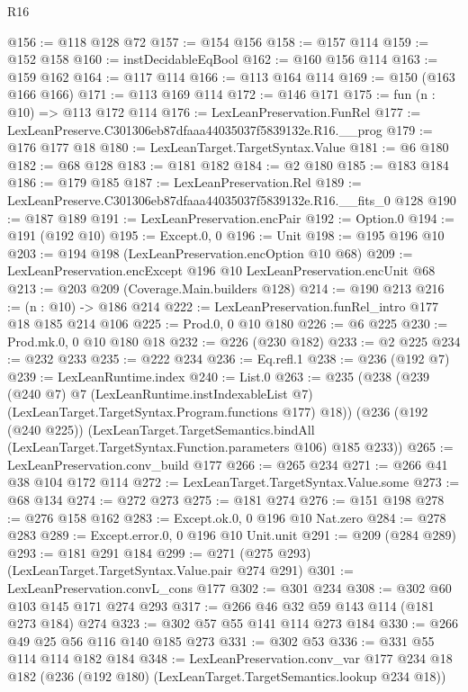\begin{lexlean}{R16}
\begin{coremodule}
@156 := @118 @128 @72
@157 := @154 @156
@158 := @157 @114
@159 := @152 @158
@160 := instDecidableEqBool
@162 := @160 @156 @114
@163 := @159 @162
@164 := @117 @114
@166 := @113 @164 @114
@169 := @150 (@163 @166 @166)
@171 := @113 @169 @114
@172 := @146 @171
@175 := fun (n : @10) => @113 @172 @114
@176 := LexLeanPreservation.FunRel
@177 := LexLeanPreserve.C301306eb87dfaaa44035037f5839132e.R16.__prog
@179 := @176 @177 @18
@180 := LexLeanTarget.TargetSyntax.Value
@181 := @6 @180
@182 := @68 @128
@183 := @181 @182
@184 := @2 @180
@185 := @183 @184
@186 := @179 @185
@187 := LexLeanPreservation.Rel
@189 := LexLeanPreserve.C301306eb87dfaaa44035037f5839132e.R16.__fits_0 @128
@190 := @187 @189
@191 := LexLeanPreservation.encPair
@192 := Option.{0}
@194 := @191 (@192 @10)
@195 := Except.{0, 0}
@196 := Unit
@198 := @195 @196 @10
@203 := @194 @198 (LexLeanPreservation.encOption @10 @68)
@209 := LexLeanPreservation.encExcept @196 @10 LexLeanPreservation.encUnit @68
@213 := @203 @209 (Coverage.Main.builders @128)
@214 := @190 @213
@216 := (n : @10) -> @186 @214
@222 := LexLeanPreservation.funRel_intro @177 @18 @185 @214 @106
@225 := Prod.{0, 0} @10 @180
@226 := @6 @225
@230 := Prod.mk.{0, 0} @10 @180 @18
@232 := @226 (@230 @182)
@233 := @2 @225
@234 := @232 @233
@235 := @222 @234
@236 := Eq.refl.{1}
@238 := @236 (@192 @7)
@239 := LexLeanRuntime.index
@240 := List.{0}
@263 := @235
    (@238
      (@239
        (@240 @7)
        @7
        (LexLeanRuntime.instIndexableList @7)
        (LexLeanTarget.TargetSyntax.Program.functions @177)
        @18))
    (@236
      (@192 (@240 @225))
      (LexLeanTarget.TargetSemantics.bindAll
        (LexLeanTarget.TargetSyntax.Function.parameters @106)
        @185
        @233))
@265 := LexLeanPreservation.conv_build @177
@266 := @265 @234
@271 := @266 @41 @38 @104 @172 @114
@272 := LexLeanTarget.TargetSyntax.Value.some
@273 := @68 @134
@274 := @272 @273
@275 := @181 @274
@276 := @151 @198
@278 := @276 @158 @162
@283 := Except.ok.{0, 0} @196 @10 Nat.zero
@284 := @278 @283
@289 := Except.error.{0, 0} @196 @10 Unit.unit
@291 := @209 (@284 @289)
@293 := @181 @291 @184
@299 := @271 (@275 @293) (LexLeanTarget.TargetSyntax.Value.pair @274 @291)
@301 := LexLeanPreservation.convL_cons @177
@302 := @301 @234
@308 := @302 @60 @103 @145 @171 @274 @293
@317 := @266 @46 @32 @59 @143 @114 (@181 @273 @184) @274
@323 := @302 @57 @55 @141 @114 @273 @184
@330 := @266 @49 @25 @56 @116 @140 @185 @273
@331 := @302 @53
@336 := @331 @55 @114 @114 @182 @184
@348 := LexLeanPreservation.conv_var
    @177
    @234
    @18
    @182
    (@236 (@192 @180) (LexLeanTarget.TargetSemantics.lookup @234 @18))

\end{coremodule}
\end{lexlean}
